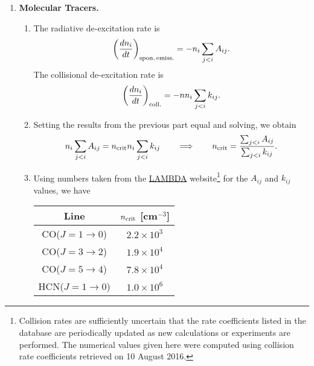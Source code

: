 \solutionset

\begin{enumerate}

\item \textbf{Molecular Tracers.}

\begin{enumerate}

\item The radiative de-excitation rate is
\begin{displaymath}
\left(\frac{dn_i}{dt}\right)_{\rm spon.\,emiss.} = -n_i \sum_{j<i} A_{ij} .
\end{displaymath}
The collisional de-excitation rate is
\begin{displaymath}
\left(\frac{dn_i}{dt}\right)_{\rm coll.} = -n n_i \sum_{j<i} k_{ij}.
\end{displaymath}

\item Setting the results from the previous part equal and solving, we obtain
\begin{displaymath}
 n_i \sum_{j<i} A_{ij} = n_{\rm crit} n_i \sum_{j<i} k_{ij} 
 \qquad \Longrightarrow \qquad
 n_{\rm crit} = \frac{\sum_{j<i} A_{ij}}{\sum_{j<i} k_{ij}}.
 \end{displaymath}
 
\item
Using numbers taken from the \href{http://www.strw.leidenuniv.nl/~moldata}{LAMBDA} website\footnote{Collision rates are
sufficiently uncertain that the rate coefficients listed in the
database are periodically updated as new calculations or experiments
are performed. The numerical values given here were computed using
collision rate coefficients retrieved on 10 August 2016.} for the $A_{ij}$ and $k_{ij}$ values, we have
\begin{center}
\begin{tabular}{c|c}
Line & $n_{\rm crit}$ [cm$^{-3}$] \\ \hline
CO($J=1\rightarrow 0$) & $2.2\times 10^3$ \\
CO($J=3\rightarrow 2$) & $1.9 \times 10^4$ \\
CO($J=5\rightarrow 4$) & $7.8\times 10^4$ \\
HCN($J=1\rightarrow 0$) & $1.0\times 10^6$
\end{tabular}
\end{center}


\end{enumerate}
\end{enumerate}
